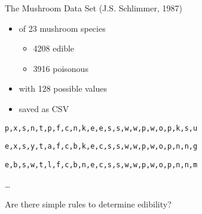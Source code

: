 \begin{frame}{The Mushroom Data Set (J.S. Schlimmer, 1987)}
	\begin{itemize}
		\item
		 of 23 mushroom species
		\begin{itemize}
			\item
			4208 edible
			
			\item
			3916 poisonous
		\end{itemize}
	
		\item
		 with 128 possible values
		
		\item
		saved as CSV
	\end{itemize}

	\begin{center}
		\texttt{p,x,s,n,t,p,f,c,n,k,e,e,s,s,w,w,p,w,o,p,k,s,u}

		\texttt{e,x,s,y,t,a,f,c,b,k,e,c,s,s,w,w,p,w,o,p,n,n,g}

		\texttt{e,b,s,w,t,l,f,c,b,n,e,c,s,s,w,w,p,w,o,p,n,n,m}

		\dots
	\end{center}

	\medspace

	\begin{block}{}
		Are there simple rules to determine edibility?
	\end{block}
\end{frame}